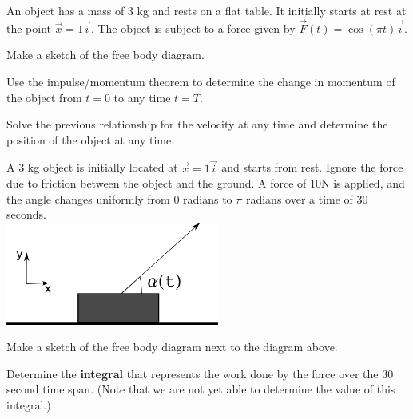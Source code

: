 \begin{problem}
\item An object has a mass of 3 kg and rests on a flat table. It
  initially starts at rest at the point $\vec{x}=1\vec{i}$. The object
  is subject to a force given by $\vec{F}(t) = \cos(\pi t) \vec{i}$.
  \begin{subproblem}
    \item Make a sketch of the free body diagram.
      \vspace{5em}
    \item Use the impulse/momentum theorem to determine the change in
      momentum of the object from $t=0$ to any time $t=T$.
      \vfill
    \item Solve the previous relationship for the velocity at any time
      and determine the position of the object at any time.
      \vfill
  \end{subproblem}

  \clearpage

\item A 3 kg object is initially located at $\vec{x}=1\vec{i}$ and
  starts from rest. Ignore the force due to friction between the
  object and the ground. A force of 10N is applied, and the angle
  changes uniformly from 0 radians to $\pi$ radians over a time of
  30 seconds.\\
  \includegraphics[width=7cm]{ink/week9/workAngleChanging}
  \begin{subproblem}
    \item Make a sketch of the free body diagram next to the diagram above.
    \item Determine the \textbf{integral} that represents the work
      done by the force over the 30 second time span.  (Note that we
      are not yet able to determine the value of this integral.)

      \vfill

  \end{subproblem}
\end{problem}

